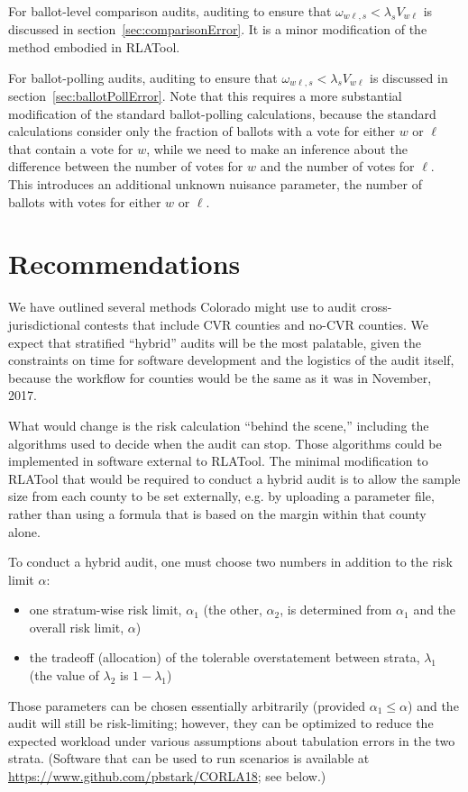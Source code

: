 \documentclass[12pt]{article}
\begin{document}
For ballot-level comparison audits, auditing to ensure that $\omega_{w\ell,s} < \lambda_s V_{w\ell}$
is discussed in section~\ref{sec:comparisonError}.  It is a minor modification of the method
embodied in RLATool.

For ballot-polling audits, auditing to ensure that $\omega_{w\ell,s} < \lambda_s V_{w\ell}$ is discussed in section~\ref{sec:ballotPollError}.
Note that this requires a more substantial modification of the standard ballot-polling calculations,
because the standard calculations consider only the fraction of ballots with a vote for either 
$w$ or $\ell$ that contain a vote for $w$, while we need to make an inference about the 
difference between the number of votes for $w$ and the number of votes for $\ell$.
This introduces an additional unknown nuisance parameter, the number of ballots with votes for either
$w$ or $\ell$.







\section{Recommendations} \label{sec:recommendations}

We have outlined several methods Colorado might use to audit cross-jurisdictional contests
that include CVR counties and no-CVR counties.
We expect that stratified ``hybrid'' audits will be the most palatable,
given the constraints on time for software development and the logistics
of the audit itself, because the workflow for counties would be the same
as it was in November, 2017.

What would change is the risk calculation ``behind the scene,'' including the
algorithms used to decide when the audit can stop.
Those algorithms could be implemented in software external to RLATool.
The minimal modification to RLATool that would be required to conduct
a hybrid audit is to allow the sample size from each county to be set externally,
e.g. by uploading a parameter file,
rather than using a formula that is based on the margin within that county alone.

To conduct a hybrid audit, one must choose two numbers
in addition to the risk limit $\alpha$:
\begin{itemize}
   \item one stratum-wise risk limit, $\alpha_1$ 
(the other, $\alpha_2$, is determined from $\alpha_1$ and the overall risk limit, $\alpha$)
   \item the tradeoff (allocation) of the tolerable overstatement between strata, $\lambda_1$
(the value of $\lambda_2$ is $1-\lambda_1$)
\end{itemize}
Those parameters can be chosen essentially arbitrarily (provided $\alpha_1 \le \alpha$)
and the audit will still be risk-limiting;
however, they can be optimized to reduce the expected workload under various
assumptions about tabulation errors in the two strata.
(Software that can be used to run scenarios is available at 
\url{https://www.github.com/pbstark/CORLA18}; see below.)
\end{document}
